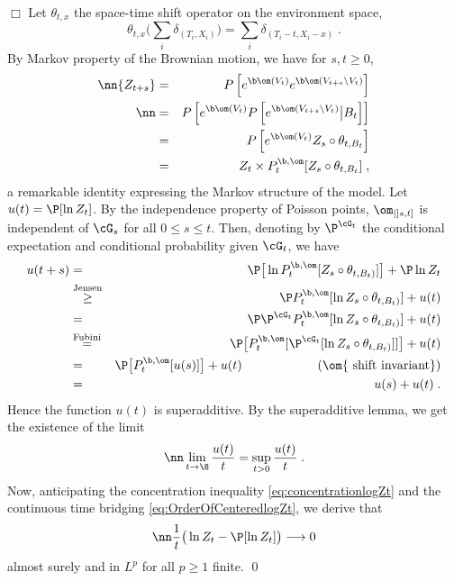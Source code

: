$\Box$ Let $\theta_{t,x}$ the space-time shift operator on the environment space, 
$$\theta_{t,x} \big(\sum_i \delta_{(T_i,X_i)}\big)= \sum_i \delta_{(T_i-t,X_i-x)}\;.$$ By Markov property of the Brownian motion,  we have for $s, t \geq 0$,
\begin{eqnarray} \nn
{Z_{t+s}} &=& P\left[ e^{\b \om(V_t)} e^{\b \om(V_{t+s} \setminus V_t)} \right] \\ \nn
&=& P\left[ e^{\b \om(V_t)} P\left[ e^{\b \om(V_{t+s} \setminus V_t)} \big \vert B_t\right] \right] \\ \label{eq:Markov2}
&=& P\left[ e^{\b \om(V_t)}  Z_s \circ \theta_{t,B_t}
\right] \\ \label{eq:Markov}
&=& {Z_t} \times \gibbs[ Z_s \circ \theta_{t,B_t}] \;,
\end{eqnarray}
a remarkable identity expressing the Markov structure of the model.
Let $u(t)= \P[ \ln Z_t]$. By the independence property of Poisson points, $\om_{|]s,t]}$ is independent of $\cG_s$ for all $0\leq s \leq t$.  Then, denoting by $\P^{\cG_t}$ the conditional expectation and  conditional
probability given $\cG_t$, we have 
\begin{eqnarray*}
u(t+s) %
&=&  \P \big[ \ln \gibbs[ Z_s \circ \theta_{t,B_t)}]  \big]+ \P \ln Z_t 
\\
&\stackrel{\rm Jensen}{\geq} 
& \P  \gibbs[   \ln  Z_s \circ \theta_{t,B_t)} ]+u(t)  \\
&=&  
 \P \P^{\cG_t} \gibbs[   \ln  Z_s \circ \theta_{t,B_t)} ]+u(t)  \\
&\stackrel{\rm Fubini}{=}&  \P  \big[  \gibbs[ \P^{\cG_t}[\ln Z_s \circ \theta_{t,B_t)}] ] \big]+u(t)\\
&=& \P \big[   \gibbs[ u(s) ]\big]+u(t) \qquad\qquad \qquad (\om {\rm \ shift\ invariant})\\
&=& u(s)+u(t)\;.
\end{eqnarray*}
Hence the function $u(t)$ is superadditive. By the superadditive lemma, we get the existence of the limit
\begin{equation}
\nn
\lim_{ t \to \8} \frac{u(t)}{t} = \sup_{t >0} \frac{u(t)}{t} \;.
\end{equation}
Now, anticipating the concentration inequality \eqref{eq:concentrationlogZt} and the continuous time bridging
\eqref{eq:OrderOfCenteredlogZt},
we derive that 
\begin{equation}
\nn
\frac{1}{t} \big( \ln Z_t- \P[\ln Z_t]\big) \longrightarrow 0
\end{equation}
almost surely and in $L^p$ for all $p\geq 1$ finite.  \qed
